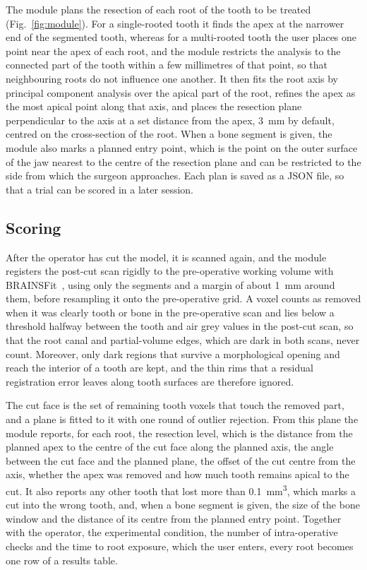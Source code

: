 \documentclass[11pt,a4paper]{article}
\begin{document}
The module plans the resection of each root of the tooth to be treated (Fig.~\ref{fig:module}). For a single-rooted tooth it finds the apex at the narrower end of the segmented tooth, whereas for a multi-rooted tooth the user places one point near the apex of each root, and the module restricts the analysis to the connected part of the tooth within a few millimetres of that point, so that neighbouring roots do not influence one another. It then fits the root axis by principal component analysis over the apical part of the root, refines the apex as the most apical point along that axis, and places the resection plane perpendicular to the axis at a set distance from the apex, \SI{3}{\milli\metre} by default, centred on the cross-section of the root. When a bone segment is given, the module also marks a planned entry point, which is the point on the outer surface of the jaw nearest to the centre of the resection plane and can be restricted to the side from which the surgeon approaches. Each plan is saved as a JSON file, so that a trial can be scored in a later session.

\subsection{Scoring}

After the operator has cut the model, it is scanned again, and the module registers the post-cut scan rigidly to the pre-operative working volume with BRAINSFit~\cite{johnson2007brainsfit}, using only the segments and a margin of about \SI{1}{\milli\metre} around them, before resampling it onto the pre-operative grid. A voxel counts as removed when it was clearly tooth or bone in the pre-operative scan and lies below a threshold halfway between the tooth and air grey values in the post-cut scan, so that the root canal and partial-volume edges, which are dark in both scans, never count. Moreover, only dark regions that survive a morphological opening and reach the interior of a tooth are kept, and the thin rims that a residual registration error leaves along tooth surfaces are therefore ignored.

The cut face is the set of remaining tooth voxels that touch the removed part, and a plane is fitted to it with one round of outlier rejection. From this plane the module reports, for each root, the resection level, which is the distance from the planned apex to the centre of the cut face along the planned axis, the angle between the cut face and the planned plane, the offset of the cut centre from the axis, whether the apex was removed and how much tooth remains apical to the cut. It also reports any other tooth that lost more than \SI{0.1}{\cubic\milli\metre}, which marks a cut into the wrong tooth, and, when a bone segment is given, the size of the bone window and the distance of its centre from the planned entry point. Together with the operator, the experimental condition, the number of intra-operative checks and the time to root exposure, which the user enters, every root becomes one row of a results table.
\end{document}
